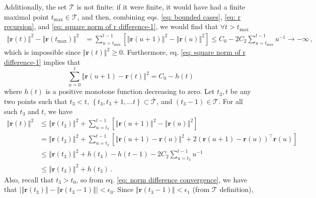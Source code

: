 \documentclass[twoside,11pt,english]{article}
\begin{document}
Additionally, the set $\mathcal{T}$ is not finite: if it were finite, it would
have had a finite maximal point $t_{\max}\in\mathcal{T}$, and then, combining eqs. \ref{eq: bounded cases}, \ref{eq: r recursion}, and \ref{eq: square norm of r difference-1},
we would find that $\forall t>t_{\max}$
\begin{align*}
\left\Vert \mathbf{r}\left(t\right)\right\Vert ^{2}-\left\Vert \mathbf{r}\left(t_{\max}\right)\right\Vert ^{2} & =\sum_{u=t_{\max}}^{t-1}\left[\left\Vert \mathbf{r}\left(u+1\right)\right\Vert ^{2}-\left\Vert \mathbf{r}\left(u\right)\right\Vert ^{2}\right]\leq C_{0}-2C_{2}\sum_{u=t_{\max}}^{t-1}u^{-1}\rightarrow-\infty\,,
\end{align*}
which is impossible since $\left\Vert \mathbf{r}\left(t\right)\right\Vert ^{2}\geq0$.
Furthermore, eq. \ref{eq: square norm of r difference-1}
implies that 
\[
\sum_{u=0}^{t}\left\Vert \mathbf{r}\left(u+1\right)-\mathbf{r}\left(t\right)\right\Vert ^{2}=C_{0}-h\left(t\right)
\]
 where $h\left(t\right)$ is a positive monotone function decreasing
to zero. Let $t_{3},t$ be any two points such that $t_{3}<t$,
$\left\{ t_{3}, t_{3}+1,\dots t\right\} \subset\bar{\mathcal{T}}$, and $\left(t_{3}-1\right)\in\mathcal{T}$. For all such  $t_{3}$ and $t$, we have 
\begin{align}
\left\Vert \mathbf{r}\left(t\right)\right\Vert ^{2}\nonumber & \leq\left\Vert \mathbf{r}\left(t_{3}\right)\right\Vert ^{2}+\sum_{u=t_{3}}^{t-1}\left[\left\Vert \mathbf{r}\left(u+1\right)\right\Vert ^{2}-\left\Vert \mathbf{r}\left(u\right)\right\Vert ^{2}\right]\\ 
\nonumber &= \left\Vert \mathbf{r}\left(t_{3}\right)\right\Vert ^{2}+\sum_{u=t_{3}}^{t-1}\left[\left\Vert \mathbf{r}\left(u+1\right)-\mathbf{r}\left(u\right)\right\Vert ^{2}+2\left(\mathbf{r}\left(u+1\right)-\mathbf{r}\left(u\right)\right)^{\top}\mathbf{r}\left(u\right)\right]\\
\nonumber
 & \leq\left\Vert \mathbf{r}\left(t_{3}\right)\right\Vert ^{2}+h\left(t_{3}\right)-h\left(t-1\right)-2C_{2}\sum_{u=t_{3}}^{t-1}u^{-1}\\ 
 & \leq\left\Vert \mathbf{r}\left(t_{3}\right)\right\Vert ^{2}+h\left(t_{3}\right)\,. \label{eq: r(t) bound}
\end{align}
Also, recall that $t_{3}>t_{0}$, so from eq. \ref{eq: norm difference convergence},
we have that $\left|\left\Vert \mathbf{r}\left(t_{3}\right)\right\Vert -\left\Vert \mathbf{r}\left(t_{3}-1\right)\right\Vert \right|<\epsilon_{0}$.
Since $\left\Vert \mathbf{r}\left(t_{3}-1\right)\right\Vert <\epsilon_{1}$ (from $\mathcal{T}$ definition),
\end{document}
